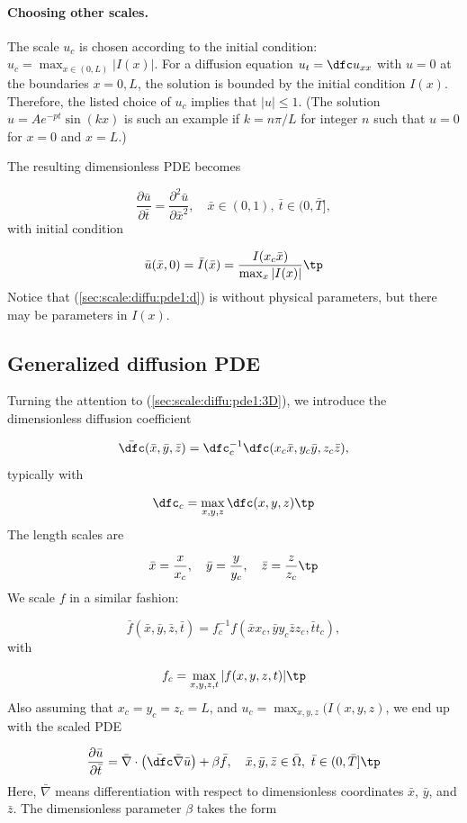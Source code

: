 \documentclass[graybox,envcountchap,sectrefs,final]{svmonodo}
\begin{document}
\paragraph{Choosing other scales.}
The scale $u_c$ is chosen according to the initial condition:
$u_c=\max_{x\in(0,L)}|I(x)|$. For a diffusion equation $u_t=\dfc u_{xx}$
with $u=0$ at the boundaries $x=0,L$, the solution is bounded by
the initial condition $I(x)$. Therefore, the listed choice of $u_c$
implies that
$|u|\leq 1$. (The solution $u=Ae^{-pt}\sin (kx)$ is such an example
if $k=n\pi/L$ for integer $n$ such that $u=0$ for $x=0$ and $x=L$.)

The resulting dimensionless PDE becomes

\begin{equation}
\frac{\partial \bar u}{\partial \bar t} =
\frac{\partial^2 \bar u}{\partial \bar x^2}, \quad  \bar x\in (0,1),\ \bar t\in (0,\bar T],
\label{sec:scale:diffu:pde1:d}
\end{equation}
with initial condition

\[ \bar u(\bar x, 0) = \bar I(\bar x) = \frac{I(x_c\bar x)}{\max_x |I(x)|}\tp\]
Notice that (\ref{sec:scale:diffu:pde1:d}) is without physical parameters,
but there may be parameters in $I(x)$.

\subsection{Generalized diffusion PDE}

Turning the attention to (\ref{sec:scale:diffu:pde1:3D}), we introduce
the dimensionless diffusion coefficient

\[ \bar\dfc(\bar x,\bar y,\bar z) =
\dfc_c^{-1}\dfc (x_c\bar x, y_c\bar y, z_c\bar z),\]
typically with

\[ \dfc_c = \max_{x,y,z}\dfc(x,y,z)\tp\]
The length scales are

\[ \bar x = \frac{x}{x_c},\quad \bar y = \frac{y}{y_c},\quad
\bar z = \frac{z}{z_c}\tp
\]
We scale $f$ in a similar fashion:

\[ \bar f(\bar x, \bar y, \bar z, \bar t)
= f_c^{-1}f(\bar xx_c, \bar yy_c \bar zz_c, \bar tt_c),\]
with

\[ f_c = \max_{x,y,z,t}|f(x,y,z,t)|\tp\]
Also assuming
that $x_c=y_c=z_c=L$, and $u_c=\max_{x,y,z}(I(x,y,z)$,
we end up with the scaled PDE

\begin{equation}
\frac{\partial \bar u}{\partial \bar t} =
\bar\nabla\cdot\left(\bar\dfc \bar\nabla \bar u\right) + \beta\bar f, \quad  \bar x,\bar y,\bar z\in \bar \Omega,\ \bar t\in (0,\bar T]\tp
\label{sec:scale:diffu:pde1:3D:d}
\end{equation}
Here, $\bar\nabla$ means differentiation with respect to dimensionless
coordinates $\bar x$, $\bar y$, and $\bar z$. The dimensionless parameter
$\beta$ takes the form
\end{document}
